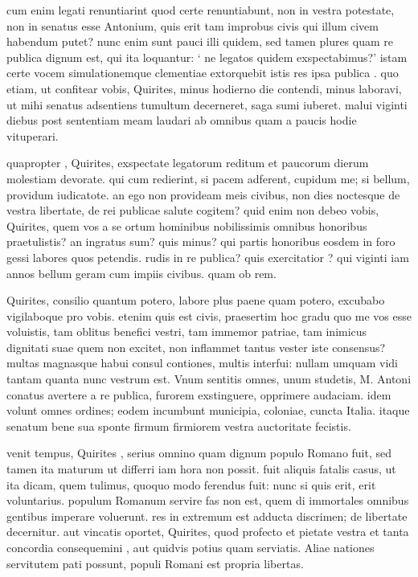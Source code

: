  cum enim legati renuntiarint quod certe renuntiabunt, non in vestra potestate, non in senatus esse Antonium, quis erit tam improbus civis qui illum civem habendum putet? nunc enim sunt pauci illi quidem, sed tamen plures quam re publica dignum est, qui ita loquantur: ` ne legatos quidem exspectabimus?' istam certe vocem simulationemque clementiae extorquebit istis res ipsa publica . quo etiam, ut confitear vobis, Quirites, minus hodierno die contendi, minus laboravi, ut mihi senatus adsentiens tumultum decerneret, saga sumi iuberet. malui viginti diebus post sententiam meam laudari ab omnibus quam a paucis hodie vituperari.

 quapropter , Quirites, exspectate legatorum reditum et paucorum dierum molestiam devorate. qui cum redierint, si pacem adferent, cupidum me; si bellum, providum iudicatote. an ego non provideam meis civibus, non dies noctesque de vestra libertate, de rei publicae salute cogitem? quid enim non debeo vobis, Quirites, quem vos a se ortum hominibus nobilissimis omnibus honoribus praetulistis? an ingratus sum? quis minus? qui partis honoribus eosdem in foro gessi labores quos petendis. rudis in re publica? quis exercitatior ? qui viginti iam annos bellum geram cum impiis civibus. quam ob rem.

 Quirites, consilio quantum potero, labore plus paene quam potero, excubabo vigilaboque pro vobis. etenim quis est civis, praesertim hoc gradu quo me vos esse voluistis, tam oblitus benefici vestri, tam immemor patriae, tam inimicus dignitati suae quem non excitet, non inflammet tantus vester iste consensus? multas magnasque habui consul contiones, multis interfui: nullam umquam vidi tantam quanta nunc vestrum est. Vnum sentitis omnes, unum studetis, M. Antoni conatus avertere a re publica, furorem exstinguere, opprimere audaciam. idem volunt omnes ordines; eodem incumbunt municipia, coloniae, cuncta Italia. itaque senatum bene sua sponte firmum firmiorem vestra auctoritate fecistis.

 venit tempus, Quirites , serius omnino quam dignum populo Romano fuit, sed tamen ita maturum ut differri iam hora non possit. fuit aliquis fatalis casus, ut ita dicam, quem tulimus, quoquo modo ferendus fuit: nunc si quis erit, erit voluntarius. populum Romanum servire fas non est, quem di immortales omnibus gentibus imperare voluerunt. res in extremum est adducta discrimen; de libertate decernitur. aut vincatis oportet, Quirites, quod profecto et pietate vestra et tanta concordia consequemini , aut quidvis potius quam serviatis. Aliae nationes servitutem pati possunt, populi Romani est propria libertas.
